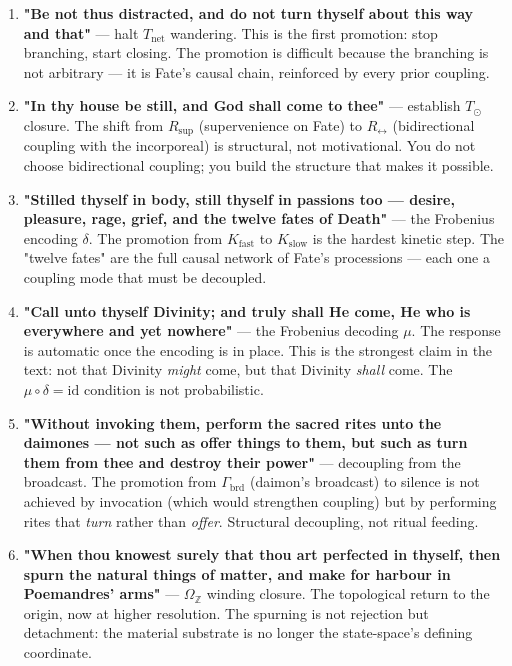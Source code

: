 \documentclass[12pt,a4paper]{article}
\begin{document}
\begin{enumerate}
    \item \textbf{"Be not thus distracted, and do not turn thyself about this way and that"} --- halt $T_\text{net}$ wandering. This is the first promotion: stop branching, start closing. The promotion is difficult because the branching is not arbitrary --- it is Fate's causal chain, reinforced by every prior coupling.
    \item \textbf{"In thy house be still, and God shall come to thee"} --- establish $T_{\odot}$ closure. The shift from $R_\text{sup}$ (supervenience on Fate) to $R_{\leftrightarrow}$ (bidirectional coupling with the incorporeal) is structural, not motivational. You do not choose bidirectional coupling; you build the structure that makes it possible.
    \item \textbf{"Stilled thyself in body, still thyself in passions too --- desire, pleasure, rage, grief, and the twelve fates of Death"} --- the Frobenius encoding $\delta$. The promotion from $K_\text{fast}$ to $K_\text{slow}$ is the hardest kinetic step. The "twelve fates" are the full causal network of Fate's processions --- each one a coupling mode that must be decoupled.
    \item \textbf{"Call unto thyself Divinity; and truly shall He come, He who is everywhere and yet nowhere"} --- the Frobenius decoding $\mu$. The response is automatic once the encoding is in place. This is the strongest claim in the text: not that Divinity \emph{might} come, but that Divinity \emph{shall} come. The $\mu \circ \delta = \text{id}$ condition is not probabilistic.
    \item \textbf{"Without invoking them, perform the sacred rites unto the daimones --- not such as offer things to them, but such as turn them from thee and destroy their power"} --- decoupling from the broadcast. The promotion from $\Gamma_\text{brd}$ (daimon's broadcast) to silence is not achieved by invocation (which would strengthen coupling) but by performing rites that \emph{turn} rather than \emph{offer}. Structural decoupling, not ritual feeding.
    \item \textbf{"When thou knowest surely that thou art perfected in thyself, then spurn the natural things of matter, and make for harbour in Poemandres' arms"} --- $\Omega_\mathbb{Z}$ winding closure. The topological return to the origin, now at higher resolution. The spurning is not rejection but detachment: the material substrate is no longer the state-space's defining coordinate.
\end{enumerate}
\end{document}
